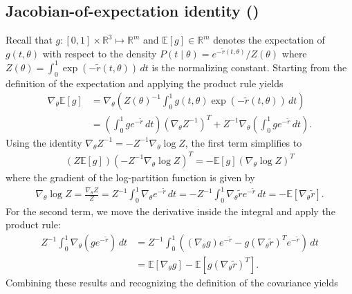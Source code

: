 \documentclass{article}
\begin{document}
\subsection{Jacobian-of-expectation identity ()}\label{app:proof-jacobian-expectation}

Recall that $g : [0, 1] \times \mathbb{R}^3 \mapsto \mathbb{R}^m$ and $\mathbb{E}[g] \in \mathbb{R}^m$ denotes the expectation of $g(t, \theta)$ with respect to the density $P(t \mid \theta) = e^{-\tilde{r}(t, \theta)} / Z(\theta)$ where $Z(\theta) = \int_0^1 \exp(-\tilde{r}(t, \theta)) \, dt$ is the normalizing constant.
Starting from the definition of the expectation and applying the product rule yields
%
\begin{align}
  \nabla_\theta \mathbb{E}[g] & = \nabla_\theta \left( Z(\theta)^{-1} \int_0^1 g(t,\theta) \exp(-\tilde{r}(t,\theta)) \, dt \right)                                              \\
                              & = \left(\int_0^1 g e^{-\tilde{r}} \, dt\right) (\nabla_\theta Z^{-1})^{T} + Z^{-1} \nabla_\theta \left( \int_0^1 g e^{-\tilde{r}} \, dt \right).
\end{align}
%
Using the identity $\nabla_\theta Z^{-1} = -Z^{-1} \nabla_\theta \log Z$, the first term simplifies to
%
\begin{align}
  \left(Z \mathbb{E}[g]\right) \left(-Z^{-1} \nabla_\theta \log Z\right)^{T} = - \mathbb{E}[g] \left(\nabla_\theta \log Z\right)^{T}
\end{align}
%
where the gradient of the log-partition function is given by
%
\begin{align}
  \nabla_\theta \log Z = \frac{\nabla_\theta Z}{Z} = Z^{-1} \int_0^1 \nabla_\theta e^{-\tilde{r}} \, dt = -Z^{-1} \int_0^1 \nabla_\theta \tilde{r} e^{-\tilde{r}} \, dt = -\mathbb{E}[\nabla_\theta \tilde{r}].
\end{align}
%
For the second term, we move the derivative inside the integral and apply the product rule:
%
\begin{align}
  Z^{-1} \int_0^1 \nabla_\theta(g e^{-\tilde{r}}) \, dt & = Z^{-1} \int_0^1 \left( (\nabla_\theta g) e^{-\tilde{r}} - g (\nabla_\theta \tilde{r})^{T} e^{-\tilde{r}} \right) \, dt \\
                                                        & = \mathbb{E}[\nabla_\theta g] - \mathbb{E}[g (\nabla_\theta \tilde{r})^{T}].
\end{align}
%
Combining these results and recognizing the definition of the covariance yields
%
\end{document}
